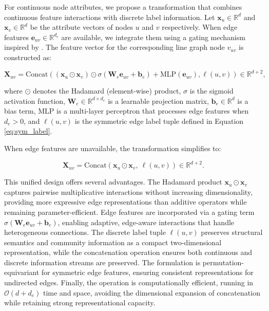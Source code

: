 \documentclass[pdflatex,sn-mathphys-num]{sn-jnl}%
\theoremstyle{thmstyleone}%
\theoremstyle{thmstyletwo}%
\theoremstyle{thmstylethree}%
\theoremstyle{plain} %
\theoremstyle{definition} %
\theoremstyle{remark} %
\theoremstyle{plain} %
\begin{document}
For continuous node attributes, we propose a transformation that combines continuous feature interactions with discrete label information. Let $\mathbf{x}_u \in \mathbb{R}^d$ and $\mathbf{x}_v \in \mathbb{R}^d$ be the attribute vectors of nodes $u$ and $v$ respectively. When edge features $\mathbf{e}_{uv} \in \mathbb{R}^{d_e}$ are available, we integrate them using a gating mechanism inspired by \cite{you2020design}. The feature vector for the corresponding line graph node $v_{uv}$ is constructed as:

\begin{equation}
\mathbf{X}_{uv} = \text{Concat}\left( 
    \left( \mathbf{x}_u \odot \mathbf{x}_v \right) \odot \sigma\left(\mathbf{W}_e \mathbf{e}_{uv} + \mathbf{b}_e\right) + \text{MLP}\left(\mathbf{e}_{uv}\right),     \ell(u,v)\right) \in \mathbb{R}^{d + 2},
\label{eq:attribute_transform_with_edge}
\end{equation}

where $\odot$ denotes the Hadamard (element-wise) product, $\sigma$ is the sigmoid activation function, $\mathbf{W}_e \in \mathbb{R}^{d \times d_e}$ is a learnable projection matrix, $\mathbf{b}_e \in \mathbb{R}^d$ is a bias term, $\text{MLP}$ is a multi-layer perceptron that processes edge features when $d_e > 0$, and $\ell(u,v)$ is the symmetric edge label tuple defined in Equation \ref{eq:sym_label}.

When edge features are unavailable, the transformation simplifies to:

\begin{equation}
\mathbf{X}_{uv} = \text{Concat}\left( 
    \mathbf{x}_u \odot \mathbf{x}_v,
    \ \ell(u,v)
\right) \in \mathbb{R}^{d + 2}.
\label{eq:attribute_transform_no_edge}
\end{equation}

This unified design offers several advantages. The Hadamard product $\mathbf{x}_u \odot \mathbf{x}_v$ captures pairwise multiplicative interactions without increasing dimensionality, providing more expressive edge representations than additive operators while remaining parameter-efficient. Edge features are incorporated via a gating term $\sigma(\mathbf{W}_e \mathbf{e}_{uv} + \mathbf{b}_e)$, enabling adaptive, edge-aware interactions that handle heterogeneous connections. The discrete label tuple $\ell(u,v)$ preserves structural semantics and community information as a compact two-dimensional representation, while the concatenation operation ensures both continuous and discrete information streams are preserved. The formulation is permutation-equivariant for symmetric edge features, ensuring consistent representations for undirected edges. Finally, the operation is computationally efficient, running in $\mathcal{O}(d + d_e)$ time and space, avoiding the dimensional expansion of concatenation while retaining strong representational capacity.
\end{document}
